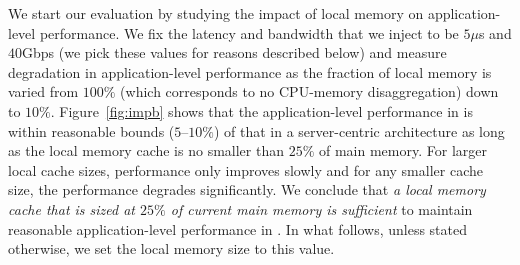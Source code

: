 We start our evaluation by studying the impact of local memory on application-level performance.
We fix the latency and bandwidth that we inject to be $5\mu$s and $40$Gbps (we pick these values for reasons described below) and measure degradation in application-level performance as the fraction of local memory is varied from $100\%$ (which corresponds to no CPU-memory disaggregation) down to $10\%$.
Figure~\ref{fig:impb} shows that the application-level performance in \dis is within reasonable bounds ($5$--$10\%$) of that in a server-centric architecture as long as the local memory cache is no smaller than $25\%$ of main memory. For larger local cache sizes, performance only improves slowly and for any smaller cache size, the performance degrades significantly. 
We conclude that \emph{a local memory cache that is sized at $25\%$ of current main memory is sufficient} to maintain reasonable application-level performance in \dis. In what follows, unless stated otherwise, we set the local memory size to this value.

